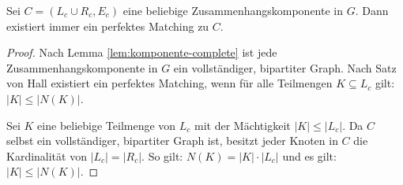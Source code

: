 \begin{lemma}\label{lem:komponente-matching}
Sei $C = (L_c \cup R_c, E_c)$ eine beliebige
Zusammenhangskomponente in $G$. Dann existiert immer ein perfektes Matching zu $C$.
\end{lemma}
\begin{proof} 
Nach Lemma \ref{lem:komponente-complete} ist jede Zusammenhangskomponente in $G$ ein vollständiger,
bipartiter Graph. Nach Satz von Hall existiert ein perfektes Matching, wenn
für alle Teilmengen $K \subseteq L_c$ gilt: $|K| \leqslant |N(K)|$.

Sei $K$ eine beliebige Teilmenge von $L_c$ mit der Mächtigkeit $|K| \leqslant |L_c|$. 
Da $C$ selbst ein vollständiger, bipartiter Graph ist,
besitzt jeder Knoten in $C$ die Kardinalität von $|L_c| = |R_c|$.
So gilt: $N(K) = |K| \cdot |L_c|$ und es gilt: $|K| \leqslant |N(K)|$.
\end{proof}


\begin{comment}
Die obere Behauptung kann für beliebig große Mächtigkeiten $|K| = k \in \mathbb{N}$
durch vollständige Induktion bewiesen werden.\\

\noindent
\tbf{Induktionsanfang:} Für $k = 1$ hat der einzelne Knoten $x \in K \subseteq L_c$
die Kardinalität $\Delta(x) = 1$.
Deshalb gilt: $|K| = 1 \leqslant |N(x)| = 1$. Damit stimmt die Behauptung für $k = 1$ und der Induktionsanfang ist erledigt.\\

\noindent
\tbf{Induktionsschritt:} Es gelte die Aussage für ein beliebiges $k \in \mathbb{N}$, also für eine Teilemenge
$K \subseteq L_c$, die aus $k$ Knoten besteht und in der jeder Knoten $x \in K$ die Kardinalität
$\Delta(x) = k$ hat.\\ Es gelte also: $|K| \leqslant |N(K)|$.\\
Zu zeigen ist die Aussage für $k + 1$, also für eine Teilmenge $K' \subseteq L_c$ der Mächtigkeit 
$|K'| = k+1$:
\[
|K'| \leqslant |N(K')|.
\] 
Wir verifizieren:

Jeder Knoten in $C$ hat den Grad $k+1$, also: $|K'| = k + 1 \leqslant |N(K')| = (k+1)^2 = k^2 + 2k + 1$.\\
Folglich stimmt die Behauptung für $k+1$.\\

Der Induktionsschritt ist damit vollzogen und es wurde bewiesen, dass die Behauptung für beliebige
Mächtigkeit von $K$ gilt.
Dadurch wurde auch bewiesen, dass es in einer Zusammenhangskomponente in $G$
 immer ein perfektes Matching gibt.
\end{comment}

